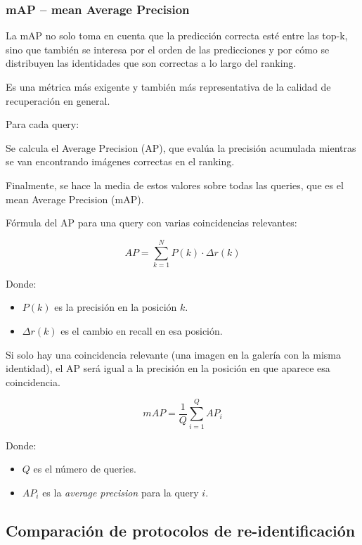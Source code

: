 \documentclass[12pt, a4paper, twoside]{article}
\begin{document}
	\subsubsection{mAP – mean Average Precision}
	
	La mAP no solo toma en cuenta que la predicción correcta esté entre las top-k, sino que también se interesa por el orden de las predicciones y por cómo se distribuyen las identidades que son correctas a lo largo del ranking.
	
	Es una métrica más exigente y también más representativa de la calidad de recuperación en general.
	
	
	Para cada query:
	
	
	Se calcula el Average Precision (AP), que evalúa la precisión acumulada mientras se van encontrando imágenes correctas en el ranking.
	
	
	Finalmente, se hace la media de estos valores sobre todas las queries, que es el mean Average Precision (mAP).
	
	
	Fórmula del AP para una query con varias coincidencias relevantes:
	
	\begin{equation}
		AP = \sum_{k=1}^N P(k) \cdot \Delta r(k)
	\end{equation}
	
	Donde:
	
	\begin{itemize}
		\item $P(k)$ es la precisión en la posición $k$.
		\item $\Delta r(k)$ es el cambio en recall en esa posición.
	\end{itemize}
	
	Si solo hay una coincidencia relevante (una imagen en la galería con la misma identidad), el AP será igual a la precisión en la posición en que aparece esa coincidencia.
	
	\begin{equation}
		mAP = \frac{1}{Q} \sum_{i=1}^{Q} AP_i
	\end{equation}
	
	Donde:
	
	\begin{itemize}
		\item $Q$ es el número de queries.
		\item $AP_i$ es la \textit{average precision} para la query $i$.
	\end{itemize}
	
 	\subsection{Comparación de protocolos de re-identificación} \cite{7410490}
 	
\end{document}
